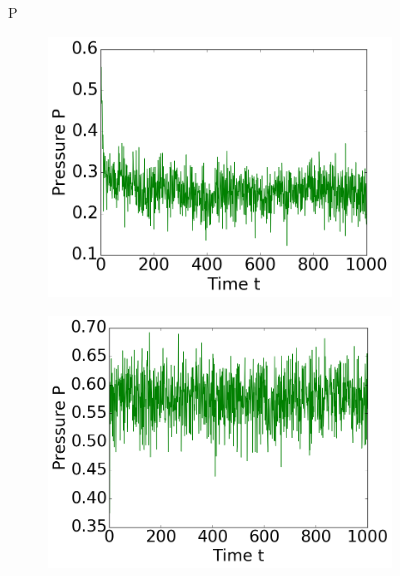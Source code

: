 \begin{figure}[ht]
\begin{subfigure}{0.3\textwidth}
\end{subfigure}

P
\hfill
\begin{subfigure}{0.3\textwidth}
\includegraphics[width=\textwidth]{../dat/Pressure_T0d3.png}
\end{subfigure}
\hfill
\begin{subfigure}{0.3\textwidth}
\includegraphics[width=\textwidth]{../dat/Pressure_T1d0.png}
\end{subfigure}
\hfill
\begin{subfigure}{0.3\textwidth}

\end{subfigure}
\end{figure}
